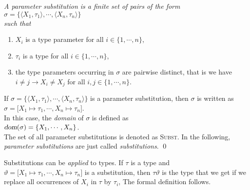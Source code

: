 \begin{Definition}
{\em
    A \emph{parameter substitution} is a finite set of pairs of the form \\[0.2cm]
    \hspace*{1.3cm} $\sigma = \bigl\{ \langle X_1, \tau_1 \rangle, \cdots, \langle X_n, \tau_n \rangle \bigr\}$ \\[0.2cm]
    such that
    \begin{enumerate}
    \item $X_i$ is a type parameter for all $i \in \{1, \cdots, n\}$,
    \item $\tau_i$ is a type for all $i \in \{1, \cdots, n\}$,
    \item the type parameters occurring in $\sigma$ are pairwise distinct, that is we have
          \\[0.2cm]
          \hspace*{1.3cm}
          $i\not=j \rightarrow X_i \not= X_j$ \quad for all $i,j  \in \{1, \cdots, n\}$.
    \end{enumerate}
    If $\sigma = \bigl\{ \langle X_1, \tau_1 \rangle, \cdots, \langle X_n, \tau_n \rangle
    \bigr\}$ is a  parameter substitution, then $\sigma$ is written as  \\[0.2cm]
    \hspace*{1.3cm} 
    $\sigma = \bigl[ X_1 \mapsto \tau_1, \cdots, X_n \mapsto \tau_n \bigr]$.  
    \\[0.2cm]
    In this case, the  \emph{domain} of $\sigma$ is defined as 
    \\[0.2cm]
    \hspace*{1.3cm}
    $\textsl{dom}(\sigma) = \{ X_1, \cdots, X_n\}$.
    \\[0.2cm]
    The set of all parameter substitutions is denoted as \textsc{Subst}.
    In the following, \emph{parameter substitutions} are just called
    \emph{substitutions}.  \qed
}  
\end{Definition}

\noindent
Substitutions can be \emph{applied} to types.
If $\tau$ is a type and 
$\vartheta = \bigl[ X_1 \mapsto \tau_1, \cdots, X_n \mapsto \tau_n \bigr]$ 
is a substitution, then $\tau\vartheta$ is the type
that we get if we replace all occurrences of $X_i$ in $\tau$ by $\tau_i$,
The formal definition follows. 

